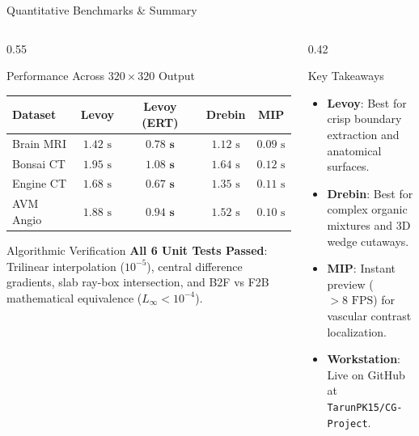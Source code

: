 \documentclass[aspectratio=169,11pt]{beamer}
\begin{document}
\begin{frame}{Quantitative Benchmarks \& Summary}
  \begin{columns}[T]
    \begin{column}{0.55\textwidth}
      \begin{block}{Performance Across $320 \times 320$ Output}
        \centering
        \footnotesize
        \begin{tabular}{@{}lcccc@{}}
          \toprule
          \textbf{Dataset} & \textbf{Levoy} & \textbf{Levoy (ERT)} & \textbf{Drebin} & \textbf{MIP} \\ \midrule
          Brain MRI & $1.42\text{ s}$ & $\mathbf{0.78\text{ s}}$ & $1.12\text{ s}$ & $0.09\text{ s}$ \\
          Bonsai CT & $1.95\text{ s}$ & $\mathbf{1.08\text{ s}}$ & $1.64\text{ s}$ & $0.12\text{ s}$ \\
          Engine CT & $1.68\text{ s}$ & $\mathbf{0.67\text{ s}}$ & $1.35\text{ s}$ & $0.11\text{ s}$ \\
          AVM Angio & $1.88\text{ s}$ & $\mathbf{0.94\text{ s}}$ & $1.52\text{ s}$ & $0.10\text{ s}$ \\ \bottomrule
        \end{tabular}
      \end{block}

      \begin{block}{Algorithmic Verification}
        \footnotesize
        \textbf{All 6 Unit Tests Passed}: Trilinear interpolation ($10^{-5}$), central difference gradients, slab ray-box intersection, and B2F vs F2B mathematical equivalence ($L_\infty < 10^{-4}$).
      \end{block}
    \end{column}

    \begin{column}{0.42\textwidth}
      \begin{block}{Key Takeaways}
        \begin{itemize}
          \item \textbf{Levoy}: Best for crisp boundary extraction and anatomical surfaces.
          \item \textbf{Drebin}: Best for complex organic mixtures and 3D wedge cutaways.
          \item \textbf{MIP}: Instant preview ($>8\text{ FPS}$) for vascular contrast localization.
          \item \textbf{Workstation}: Live on GitHub at \texttt{TarunPK15/CG-Project}.
        \end{itemize}
      \end{block}
    \end{column}
  \end{columns}
\end{frame}
\end{document}
